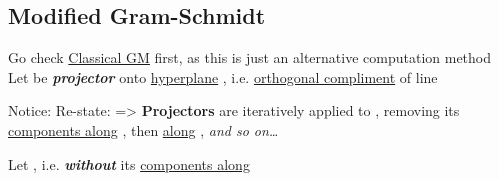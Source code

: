 \subsection*{Modified Gram-Schmidt}

\begin{itemize}

      \vItem
            Go check \ul{Classical GM} first, as this is just an alternative computation method
      \vItem
            Let
            be \textbf{\emph{projector}} onto \ul{hyperplane} ,
            i.e. \ul{orthogonal compliment} of line 

            \begin{itemize}

                  \vItem
                        Notice:
                  \vItem
                        Re-state:
                        =>
                  \vItem
                        \textbf{Projectors} 
                        are iteratively applied to , removing its \ul{components along} ,
                        then \ul{along} , \emph{and so on\ldots{}}
            \end{itemize}
      \vItem
            Let ,
            i.e.  \textbf{\emph{without}} its \ul{components along} 

            \begin{itemize}


\end{itemize}
\end{itemize}
